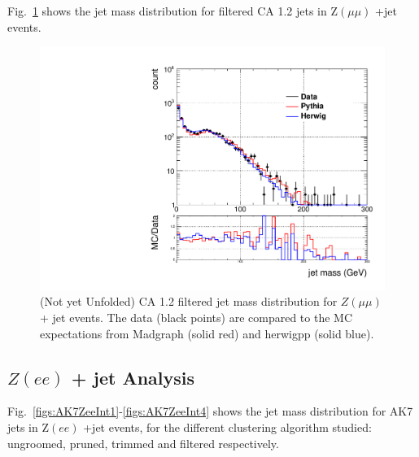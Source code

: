 Fig.~\ref{figs:filteredZmmInt1} shows the jet mass distribution for filtered CA 1.2 jets in Z$(\mu\mu)$ +jet events.

\begin{figure}[!htb]
\centering
\includegraphics[width=1.\textwidth]{figs/Zmm/jetmassReco_ca12mdft_allpT.pdf}
\caption{(Not yet Unfolded) CA 1.2 filtered jet mass distribution for $Z(\mu\mu)$+ jet events. The data (black points) are compared to the MC expectations from Madgraph (solid red) and herwigpp (solid blue).}
\label{figs:filteredZmmInt1}
\end{figure}

\clearpage

\subsection{$Z(ee)$ + jet Analysis}

Fig.~\ref{figs:AK7ZeeInt1}-\ref{figs:AK7ZeeInt4} shows the jet mass distribution for AK7 jets in Z$(ee)$ +jet events, for the different clustering algorithm studied: ungroomed, pruned, trimmed and filtered respectively.

